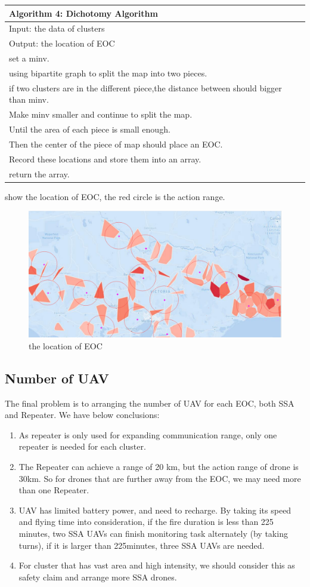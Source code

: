 \documentclass{mcmthesis}
\begin{document}
\begin{tabular}{l}
	\hline
	Algorithm 4: Dichotomy Algorithm \\
	\hline
	Input: the data of clusters\\
	Output: the location of EOC\\
	set a minv. \\
	using bipartite graph to split the map into two pieces. \\
	if two clusters are in the different piece,the distance between should bigger than minv.\\
	Make minv smaller and continue to split the map. \\
	Until the area of each piece is small enough. \\
	Then the center of the piece of map should place an EOC. \\
	Record these locations and store them into an array.\\
	return the array. \\
	\hline
\end{tabular}

 show the location of EOC, the red circle is the action range.
\begin{figure}[h]
	\small
	\centering
	\includegraphics[width=0.8\linewidth]{Figure/EOC.png}
	\caption{the location of EOC} \label{fig:EOC}
\end{figure}
\subsection{Number of UAV}
The final problem is to arranging the number of UAV for each EOC, both SSA and Repeater.
We have below conclusions:
\begin{enumerate}
	\item As repeater is only used for expanding communication range, only one repeater is needed for each cluster.
	\item The Repeater can achieve a range of 20 km, but the action range of drone is 30km. So for drones that are further away from the EOC, we may need more than one Repeater.
	\item UAV has limited battery power, and need to recharge. By taking its speed and flying time into consideration, if the ﬁre duration is less than 225 minutes, two SSA UAVs can ﬁnish monitoring task alternately (by taking turns), if it is larger than 225minutes, three SSA UAVs are needed.
	\item For cluster that has vast area and high intensity, we should consider this as safety claim and arrange  more SSA drones.
\end{enumerate}
\end{document}
